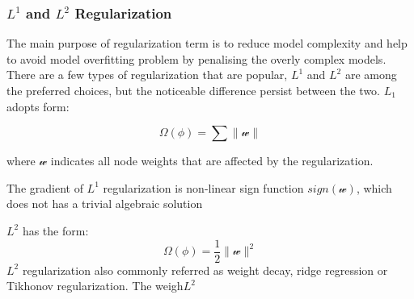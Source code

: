 \subsubsection{$L^1$ and $L^2$ Regularization}

The main purpose of regularization term is to reduce model complexity and help to avoid model overfitting problem by penalising the overly complex models. There are a few types of regularization that are popular, $L^1$ and $L^2$ are among the preferred choices, but the noticeable difference persist between the two. $L_1$ adopts form:

\begin{equation}
   \Omega(\phi) = \sum \parallel \mathcal{w} \parallel
\end{equation}

where $\mathcal{w}$ indicates all node weights that are affected by the regularization. 
\par 
The gradient of $L^1$ regularization is non-linear sign function $sign (\mathcal{w})$, which does not has a trivial algebraic solution

$L^2$ has the form:
\begin{equation}
   \Omega(\phi) = \frac {1}{2} \parallel \mathcal{w} \parallel^2
\end{equation}
$L^2$ regularization also commonly referred as weight decay, ridge regression or Tikhonov regularization. The weigh$L^2$  